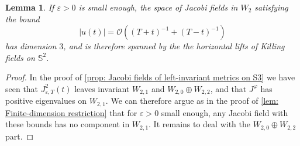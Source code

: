 \documentclass{article}
\numberwithin{equation}{section}        %
\theoremstyle{bfnote}
\newtheorem{lem}[thm]{Lemma}                %
\theoremstyle{definition}
\theoremstyle{bfremark}
\newcommand{\Sp}{\mathbb{S}}                %
\begin{document}
\begin{lem}     \label{lem: S4 Hopf example excluding non-Killing Jacobi fields into W2}
    If $\varepsilon > 0$ is small enough, the space of Jacobi fields in $W_2$ satisfying the bound 
    \begin{equation*}
        |u(t)| = \mathcal{O}((T+t)^{-1} + (T-t)^{-1})
    \end{equation*}
    has dimension $3$, and is therefore spanned by the the horizontal lifts of Killing fields on $\Sp^2$.
\end{lem}

\begin{proof}
    In the proof of \cref{prop: Jacobi fields of left-invariant metrics on S3} we have seen that $J^2_{\varepsilon,T}(t)$ leaves invariant $W_{2,1}$ and $W_{2,0} \oplus W_{2,2}$, and that $J^\varphi$ has positive eigenvalues on $W_{2,1}$. We can therefore argue as in the proof of \cref{lem: Finite-dimension restriction} that for $\varepsilon > 0$ small enough, any Jacobi field with these bounds has no component in $W_{2,1}$. It remains to deal with the $W_{2,0} \oplus W_{2,2}$ part.


\end{proof}
\end{document}
